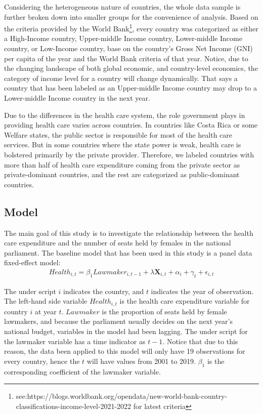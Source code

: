 Considering the heterogeneous nature of countries, the whole data sample is further broken down into smaller groups for the convenience of analysis.
Based on the criteria provided by the World Bank\footnote{see:https://blogs.worldbank.org/opendata/new-world-bank-country-classifications-income-level-2021-2022 for latest criteria}, every country was categorized as either a High-Income country, Upper-middle Income country, Lower-middle Income country, or Low-Income country, base on the country's Gross Net Income (GNI) per capita of the year and the World Bank criteria of that year.
Notice, due to the changing landscape of both global economic, and country-level economics, the category of income level for a country will change dynamically.
That says a country that has been labeled as an Upper-middle Income country may drop to a Lower-middle Income country in the next year. 

Due to the differences in the health care system, the role government plays in providing health care varies across countries.
In countries like Costa Rica or some Welfare states, the public sector is responsible for most of the health care services.
But in some countries where the state power is weak, health care is bolstered primarily by the private provider. 
Therefore, we labeled countries with more than half of health care expenditure coming from the private sector as private-dominant countries, and the rest are categorized as public-dominant countries.





\subsection{Model}
\label{Model}
The main goal of this study is to investigate the relationship between the health care expenditure and the number of seats held by females in the national parliament.
The baseline model that has been used in this study is a panel data fixed-effect model:
\begin{align}
\label{fundation model}
	Health_{i,t} = \beta_1 Lawmaker_{i,t-1} + \lambda\mathbf{X}_{i,t} + \alpha_i + \gamma_t + \epsilon_{i,t}
\end{align}

The under script $i$ indicates the country, and $t$ indicates the year of observation.
The left-hand side variable $Health_{i,t}$ is the health care expenditure variable for country $i$ at year $t$.
$Lawmaker$ is the proportion of seats held by female lawmakers, and because the parliament usually decides on the next year's national budget, variables in the model had been lagging. 
The under script for the lawmaker variable has a time indicator as $t-1$.
Notice that due to this reason, the data been applied to this model will only have 19 observations for every country, hence the $t$ will have values from 2001 to 2019.
$\beta_{1}$ is the corresponding coefficient of the lawmaker variable.

